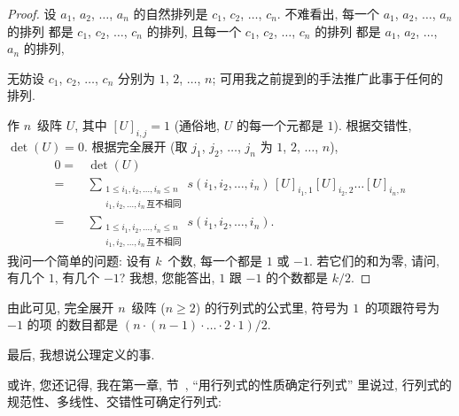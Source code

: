 \begin{proof}
    设 \(a_1\), \(a_2\), \(\dots\), \(a_n\)
    的自然排列是 \(c_1\), \(c_2\), \(\dots\), \(c_n\).
    不难看出,
    每一个 \(a_1\), \(a_2\), \(\dots\), \(a_n\) 的排列%
    都是 \(c_1\), \(c_2\), \(\dots\), \(c_n\) 的排列,
    且每一个 \(c_1\), \(c_2\), \(\dots\), \(c_n\) 的排列%
    都是 \(a_1\), \(a_2\), \(\dots\), \(a_n\) 的排列,

    无妨设 \(c_1\), \(c_2\), \(\dots\), \(c_n\)
    分别为 \(1\), \(2\), \(\dots\), \(n\);
    可用我之前提到的手法推广此事于任何的排列.

    作 \(n\)~级阵 \(U\),
    其中 \([U]_{i,j} = 1\)
    (通俗地, \(U\) 的每一个元都是 \(1\)).
    根据交错性, \(\det {(U)} = 0\).
    根据完全展开
    (取 \(j_1\), \(j_2\), \(\dots\), \(j_n\)
    为 \(1\), \(2\), \(\dots\), \(n\)),
    \begin{align*}
        0
        = {} & \det {(U)}
        \\
        = {} & \sum_{\substack{
        1 \leq i_1, i_2, \dots, i_n \leq n \\
                i_1, i_2, \dots, i_n\,\text{互不相同}
            }}
        {s(i_1, i_2, \dots, i_n)\,
            [U]_{i_1,1} [U]_{i_2,2} \dots [U]_{i_n,n}}
        \\
        = {} & \sum_{\substack{
        1 \leq i_1, i_2, \dots, i_n \leq n \\
                i_1, i_2, \dots, i_n\,\text{互不相同}
            }}
        {s(i_1, i_2, \dots, i_n)}.
    \end{align*}
    我问一个简单的问题:
    设有 \(k\)~个数, 每一个都是 \(1\) 或 \(-1\).
    若它们的和为零, 请问, 有几个 \(1\), 有几个 \(-1\)?
    我想, 您能答出,
    \(1\) 跟 \(-1\) 的个数都是 \(k/2\).
\end{proof}

由此可见,
完全展开 \(n\)~级阵 (\(n \geq 2\)) 的行列式的公式里,
符号为 \(1\)~的项跟符号为 \(-1\) 的项%
的数目都是
\((n \cdot (n - 1) \cdot \dots \cdot 2 \cdot 1)/2\).

\vspace{2ex}

最后, 我想说公理定义的事.

或许, 您还记得,
我在第一章, 节~,
``用行列式的性质确定行列式'' 里说过,
行列式的规范性、多线性、交错性可确定行列式:

